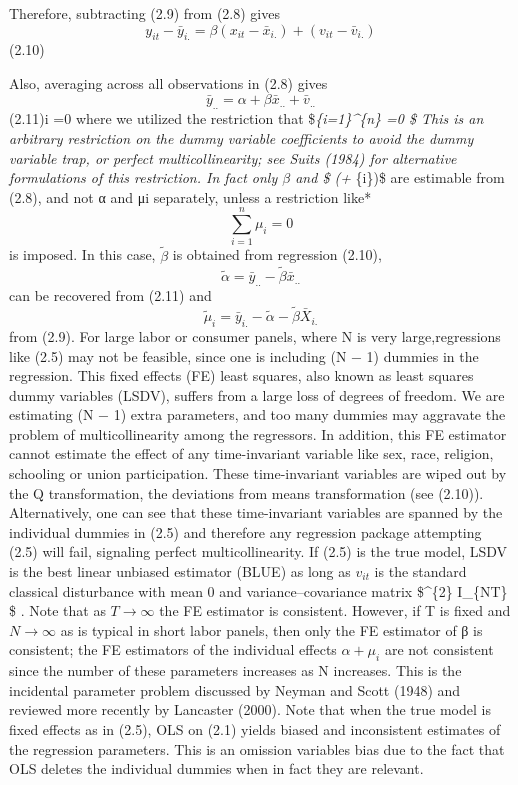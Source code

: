 \documentclass[
]{book}
\begin{document}
Therefore, subtracting (2.9) from (2.8) gives \[y_{it}-\bar{y}_{i.}=\beta (x_{it}-\bar{x}_{i.}) + (v_{it}-\bar{v}_{i.})   \] (2.10)

Also, averaging across all observations in (2.8) gives \[\bar{y}_{..}=\alpha + \beta \bar{x}_{..} + \bar{v}_{..} \] (2.11)i =0 where we utilized the restriction that \$\sum\emph{\{i=1\}\^{}\{n\} =0 \$ This is an arbitrary restriction on the dummy variable coefficients to avoid the dummy variable trap, or perfect multicollinearity; see Suits (1984) for alternative formulations of this restriction. In fact only \(\beta\) and \$ (\alpha + \mu}\{i\})\$ are estimable from (2.8), and not α and μi separately, unless a restriction like* \[\sum_{i=1}^{n} \mu_{i}=0 \] is imposed. In this case, \(\widetilde {\beta}\) is obtained from regression (2.10), \[\widetilde {\alpha}= \bar {y}_{..}-\widetilde {\beta} \bar{x}_{..} \] can be recovered from (2.11) and \[\widetilde {\mu}_{i}=\bar{y}_{i.}- \widetilde {\alpha} - \widetilde {\beta} \bar{X}_{i.} \] from (2.9). For large labor or consumer panels, where N is very large,regressions like (2.5) may not be feasible, since one is including (N − 1) dummies in the regression. This fixed effects (FE) least squares, also known as least squares dummy variables (LSDV), suffers from a large loss of degrees of freedom. We are estimating (N − 1) extra parameters, and too many dummies may aggravate the problem of multicollinearity among the regressors. In addition, this FE estimator cannot estimate the effect of any time-invariant variable like sex, race, religion, schooling or union participation. These time-invariant variables are wiped out by the Q transformation, the deviations from means transformation (see (2.10)). Alternatively, one can see that these time-invariant variables are spanned by the individual dummies in (2.5) and therefore any regression package attempting (2.5) will fail, signaling perfect multicollinearity. If (2.5) is the true model, LSDV is the best linear unbiased estimator (BLUE) as long as \(v_{it}\) is the standard classical disturbance with mean 0 and variance--covariance matrix \$\^{}\{2\} I\_\{NT\} \$ . Note that as \(T \rightarrow \infty\) the FE estimator is consistent. However, if T is fixed and \(N \rightarrow \infty\) as is typical in short labor panels, then only the FE estimator of β is consistent; the FE estimators of the individual effects \(\alpha + \mu_{i}\) are not consistent since the number of these parameters increases as N increases. This is the incidental parameter problem discussed by Neyman and Scott (1948) and reviewed more recently by Lancaster (2000). Note that when the true model is fixed effects as in (2.5), OLS on (2.1) yields biased and inconsistent estimates of the regression parameters. This is an omission variables bias due to the fact that OLS deletes the individual dummies when in fact they are relevant.
\end{document}
